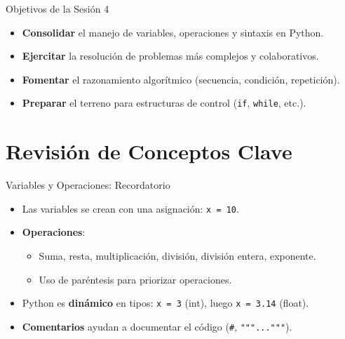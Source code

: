 \documentclass[10pt]{beamer}
\begin{document}
\begin{frame}{Objetivos de la Sesión 4}
  \begin{itemize}
    \item \textbf{Consolidar} el manejo de variables, operaciones y sintaxis en Python.
    \item \textbf{Ejercitar} la resolución de problemas más complejos y colaborativos.
    \item \textbf{Fomentar} el razonamiento algorítmico (secuencia, condición, repetición).
    \item \textbf{Preparar} el terreno para estructuras de control (\texttt{if}, \texttt{while}, etc.).
  \end{itemize}
\end{frame}

\section{Revisión de Conceptos Clave}

\begin{frame}{Variables y Operaciones: Recordatorio}
  \begin{itemize}
    \item Las variables se crean con una asignación: \texttt{x = 10}.
    \item \textbf{Operaciones}:
      \begin{itemize}
        \item Suma, resta, multiplicación, división, división entera, exponente.
        \item Uso de paréntesis para priorizar operaciones.
      \end{itemize}
    \item Python es \textbf{dinámico} en tipos: \texttt{x = 3} (int), luego \texttt{x = 3.14} (float).
    \item \textbf{Comentarios} ayudan a documentar el código (\texttt{\#}, \texttt{"""..."""}).
  \end{itemize}
\end{frame}
\end{document}
